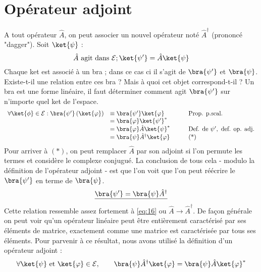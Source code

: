 \section{Opérateur adjoint}
A tout opérateur $\hat{A}$, on peut associer un nouvel opérateur noté $\hat{A}^\dagger$ (prononcé "dagger"). 
Soit $\ket{\psi}$ :
\begin{equation}
\hat{A} \text{ agit dans }\mathcal{E} ; \ket{\psi'} = \hat{A}\ket{\psi}
\label{eq:16}
\end{equation}
Chaque ket est associé à un bra ; dans ce cas ci il s'agit de $\bra{\psi'}$ et
$\bra{\psi}$. Existe-t-il une relation entre ces bra ? Mais à quoi cet objet 
correspond-t-il ? Un bra est une forme linéaire, il faut déterminer comment 
agit $\bra{\psi'}$ sur n'importe quel ket de l'espace.
\begin{equation}
\begin{array}{lll}
\forall \ket{\phi} \in \mathcal{E} : \bra{\psi'}\left(\ket{\varphi}\right) &\equiv 
\bra{\psi'}\ket{\varphi} & \qquad \text{Prop. p.scal.}\\
&= \bra{\varphi}\ket{\psi'}^*\\
&= \bra{\varphi}\hat{A}\ket{\psi}^* & \qquad \text{Def. de }\psi', \text{ def. op. adj.}\\
&= \bra{\psi}\hat{A}^\dagger\ket{\varphi}& \qquad \text{(*)}
\end{array}
\end{equation}
Pour arriver à $(*)$, on peut remplacer $\hat{A}$ par son adjoint si l'on 
permute les termes et considère le complexe conjugué.
La conclusion de tous cela - modulo la définition de l'opérateur adjoint - est 
que l'on voit que l'on peut réécrire le $\bra{\psi'}$ en terme de $\bra{\psi}$.
\begin{equation}
\underline{\bra{\psi'} = \bra{\psi}\hat{A}^\dagger}
\end{equation}
Cette relation ressemble assez fortement à \autoref{eq:16} ou $\hat{A}\rightarrow
\hat{A}^\dagger$.
De façon générale on peut voir qu'un opérateur linéaire peut être entièrement 
caractérisé par ses éléments de matrice, exactement comme une matrice est 
caractérisée par tous ses éléments. Pour parvenir à ce résultat, nous avons 
utilisé la définition d'un opérateur adjoint :
\begin{equation}
\forall \ket{\psi} \text{ et } \ket{\varphi} \in \mathcal{E},\qquad 
\bra{\psi}\hat{A}^\dagger \ket{\varphi} = \bra{\psi}\hat{A}\ket{\varphi}^*
\end{equation}

